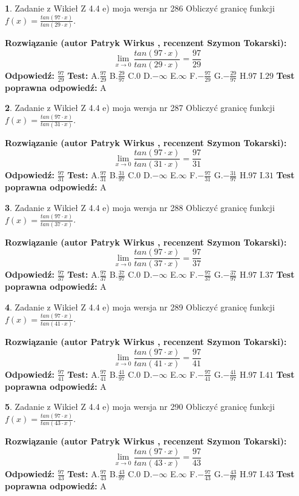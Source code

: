 \documentclass[12pt, a4paper]{article}
\theoremstyle{definition} %
\newtheorem{zad}{}
\newcommand{\zadStart}[1]{\begin{zad}#1\newline}
\newcommand{\zadStop}{\end{zad}}
\newcommand{\rozwStart}[2]{\noindent \textbf{Rozwiązanie (autor #1 , recenzent #2): }\newline}
\newcommand{\rozwStop}{\newline}
\newcommand{\odpStart}{\noindent \textbf{Odpowiedź:}\newline}
\newcommand{\odpStop}{\newline}
\newcommand{\testStart}{\noindent \textbf{Test:}\newline}
\newcommand{\testStop}{\newline}
\newcommand{\kluczStart}{\noindent \textbf{Test poprawna odpowiedź:}\newline}
\newcommand{\kluczStop}{\newline}
\begin{document}
\zadStart{Zadanie z Wikieł Z 4.4 e) moja wersja nr 286}
Obliczyć granicę funkcji $f(x)=\frac{tan(97\cdot x)}{tan(29\cdot x)}$.
\zadStop
\rozwStart{Patryk Wirkus}{Szymon Tokarski}
$$\lim\limits_{x\to 0}\frac{tan(97\cdot x)}{tan(29\cdot x)}=
\frac{97}{29}$$
\rozwStop
\odpStart
$\frac{97}{29}$
\odpStop
\testStart
A.$\frac{97}{29}$
B.$\frac{29}{97}$
C.$0$
D.$-\infty$
E.$\infty$
F.$-\frac{97}{29}$
G.$-\frac{29}{97}$
H.$97$
I.$29$
\testStop
\kluczStart
A
\kluczStop



\zadStart{Zadanie z Wikieł Z 4.4 e) moja wersja nr 287}
Obliczyć granicę funkcji $f(x)=\frac{tan(97\cdot x)}{tan(31\cdot x)}$.
\zadStop
\rozwStart{Patryk Wirkus}{Szymon Tokarski}
$$\lim\limits_{x\to 0}\frac{tan(97\cdot x)}{tan(31\cdot x)}=
\frac{97}{31}$$
\rozwStop
\odpStart
$\frac{97}{31}$
\odpStop
\testStart
A.$\frac{97}{31}$
B.$\frac{31}{97}$
C.$0$
D.$-\infty$
E.$\infty$
F.$-\frac{97}{31}$
G.$-\frac{31}{97}$
H.$97$
I.$31$
\testStop
\kluczStart
A
\kluczStop



\zadStart{Zadanie z Wikieł Z 4.4 e) moja wersja nr 288}
Obliczyć granicę funkcji $f(x)=\frac{tan(97\cdot x)}{tan(37\cdot x)}$.
\zadStop
\rozwStart{Patryk Wirkus}{Szymon Tokarski}
$$\lim\limits_{x\to 0}\frac{tan(97\cdot x)}{tan(37\cdot x)}=
\frac{97}{37}$$
\rozwStop
\odpStart
$\frac{97}{37}$
\odpStop
\testStart
A.$\frac{97}{37}$
B.$\frac{37}{97}$
C.$0$
D.$-\infty$
E.$\infty$
F.$-\frac{97}{37}$
G.$-\frac{37}{97}$
H.$97$
I.$37$
\testStop
\kluczStart
A
\kluczStop



\zadStart{Zadanie z Wikieł Z 4.4 e) moja wersja nr 289}
Obliczyć granicę funkcji $f(x)=\frac{tan(97\cdot x)}{tan(41\cdot x)}$.
\zadStop
\rozwStart{Patryk Wirkus}{Szymon Tokarski}
$$\lim\limits_{x\to 0}\frac{tan(97\cdot x)}{tan(41\cdot x)}=
\frac{97}{41}$$
\rozwStop
\odpStart
$\frac{97}{41}$
\odpStop
\testStart
A.$\frac{97}{41}$
B.$\frac{41}{97}$
C.$0$
D.$-\infty$
E.$\infty$
F.$-\frac{97}{41}$
G.$-\frac{41}{97}$
H.$97$
I.$41$
\testStop
\kluczStart
A
\kluczStop



\zadStart{Zadanie z Wikieł Z 4.4 e) moja wersja nr 290}
Obliczyć granicę funkcji $f(x)=\frac{tan(97\cdot x)}{tan(43\cdot x)}$.
\zadStop
\rozwStart{Patryk Wirkus}{Szymon Tokarski}
$$\lim\limits_{x\to 0}\frac{tan(97\cdot x)}{tan(43\cdot x)}=
\frac{97}{43}$$
\rozwStop
\odpStart
$\frac{97}{43}$
\odpStop
\testStart
A.$\frac{97}{43}$
B.$\frac{43}{97}$
C.$0$
D.$-\infty$
E.$\infty$
F.$-\frac{97}{43}$
G.$-\frac{43}{97}$
H.$97$
I.$43$
\testStop
\kluczStart
A
\kluczStop
\end{document}

